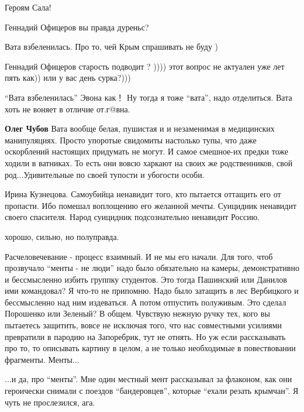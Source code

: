 \begin{itemize}
\begin{itemize}
Героям Сала!

Геннадий Офицеров вы правда дуреньс?

Вата взбеленилась. Про то, чей Крым спрашивать не буду )

Геннадий Офицеров старость подводит ?
)))) этот вопрос не актуален уже лет пять как)) или у вас день сурка?)))

\enquote{Вата взбеленилась}
Эвона как！ Ну тогда я тоже \enquote{вата}, надо отделиться. Вата хоть не воняет в отличие от.г@вна.


\textbf{Олег Чубов} Вата вообще белая, пушистая и и незаменимая в медицинских
манипуляциях. Просто упоротые свидомиты настолько тупы, что даже оскорблений
настоящих придумать не могут. И самое смешное-их предки тоже ходили в ватниках.
То есть они вовсю харкают на своих же родственников, свой род...Удивительные по
своей тупости и убогости особи.

Ирина Кузнецова.  Самоубийца ненавидит того, кто пытается оттащить его от
пропасти. Ибо помешал воплощению его желанной мечты. Суицидник ненавидит своего
спасителя.  Народ суицидник подсознательно ненавидит Россию.
\end{itemize}


хорошо, сильно, но полуправда.  

Расчеловечевание - процесс взаимный. И не мы
его начали. Для того, чтоб прозвучало \enquote{менты - не люди} надо было обязательно
на камеры, демонстративно и бессмысленно избить группку студентов. Это тогда
Пашинский или Данилов ими командовал? Я что-то не припомню.  Надо было затащить
в лес Вербицкого и бессмысленно над ним издеваться. А потом отпустить
полуживым.  Это сделал Порошенко или Зеленый?  В общем. Чувствую нежную ручку
тех, кого вы пытаетесь защитить, вовсе не исключая того, что нас совместными
усилиями превратили в пародию на Запоребрик, тут не отнять. Но уж если
рассказывать про то, то описывать картину в целом, а не только необходимые в
повествовании фрагменты. Менты...

\begin{itemize}

...и да, про \enquote{менты}. Мне один местный мент рассказывал за флаконом, как они
героически снимали с поездов \enquote{бандеровцев}, которые \enquote{ехали резать крымчан}. Я
чуть не прослезился, ага.


\end{itemize}
\end{itemize}
